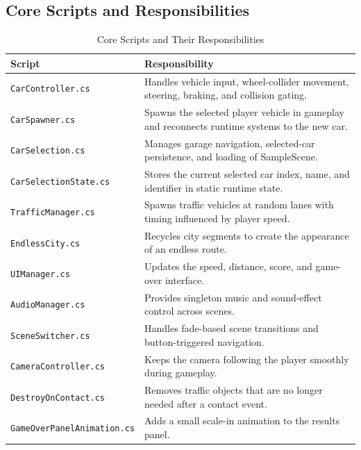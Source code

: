 \documentclass[12pt,a4paper]{article}
\begin{document}
\subsection{Core Scripts and Responsibilities}
\begin{table}[!htbp]
\centering
\caption{Core Scripts and Their Responsibilities}
\begin{tabularx}{\textwidth}{@{}L{4.2cm}Y@{}}
\toprule
Script & Responsibility \\
\midrule
\texttt{CarController.cs} & Handles vehicle input, wheel-collider movement, steering, braking, and collision gating. \\
\texttt{CarSpawner.cs} & Spawns the selected player vehicle in gameplay and reconnects runtime systems to the new car. \\
\texttt{CarSelection.cs} & Manages garage navigation, selected-car persistence, and loading of SampleScene. \\
\texttt{CarSelectionState.cs} & Stores the current selected car index, name, and identifier in static runtime state. \\
\texttt{TrafficManager.cs} & Spawns traffic vehicles at random lanes with timing influenced by player speed. \\
\texttt{EndlessCity.cs} & Recycles city segments to create the appearance of an endless route. \\
\texttt{UIManager.cs} & Updates the speed, distance, score, and game-over interface. \\
\texttt{AudioManager.cs} & Provides singleton music and sound-effect control across scenes. \\
\texttt{SceneSwitcher.cs} & Handles fade-based scene transitions and button-triggered navigation. \\
\texttt{CameraController.cs} & Keeps the camera following the player smoothly during gameplay. \\
\texttt{DestroyOnContact.cs} & Removes traffic objects that are no longer needed after a contact event. \\
\texttt{GameOverPanelAnimation.cs} & Adds a small scale-in animation to the results panel. \\
\bottomrule
\end{tabularx}
\end{table}
\end{document}
